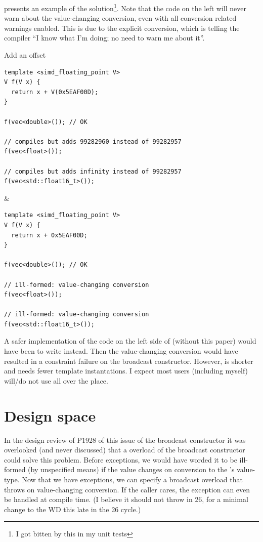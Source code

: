  presents an example of the solution\footnote{I got bitten by this in my
 unit tests}.
Note that the code on the left will never warn about the value-changing conversion, even with all
conversion related warnings enabled.
This is due to the explicit conversion, which is telling the compiler “I know what I'm doing; no
need to warn me about it”.
\begin{tonytable}{Add an offset}\label{tt:add-an-offset}
  \begin{lstlisting}
template <simd_floating_point V>
V f(V x) {
  return x + V(0x5EAF00D);
}

f(vec<double>()); // OK

// compiles but adds 99282960 instead of 99282957
f(vec<float>());

// compiles but adds infinity instead of 99282957
f(vec<std::float16_t>());
  \end{lstlisting}
  &
  \begin{lstlisting}
template <simd_floating_point V>
V f(V x) {
  return x + 0x5EAF00D;
}

f(vec<double>()); // OK

// ill-formed: value-changing conversion
f(vec<float>());

// ill-formed: value-changing conversion
f(vec<std::float16_t>());
  \end{lstlisting}
\end{tonytable}%

A safer implementation of the code on the left side of  (without this paper)
would have been to write  instead.
Then the value-changing conversion would have resulted in a constraint failure on the broadcast
constructor.
However,  is shorter and needs fewer template instantations.
I expect most users (including myself) will/do not use  all over the place.

\section{Design space}
In the design review of P1928 of this issue of the broadcast constructor it was overlooked (and
never discussed) that a  overload of the broadcast constructor could solve this
problem.
Before  exceptions, we would have worded it to be ill-formed (by unspecified means)
if the value changes on conversion to the 's value-type.
Now that we have  exceptions, we can specify a  broadcast overload
that throws on value-changing conversion.
If the caller cares, the exception can even be handled at compile time.
(I believe it should not throw in \CC{}26, for a minimal change to the WD this late in the \CC{}26
cycle.)

